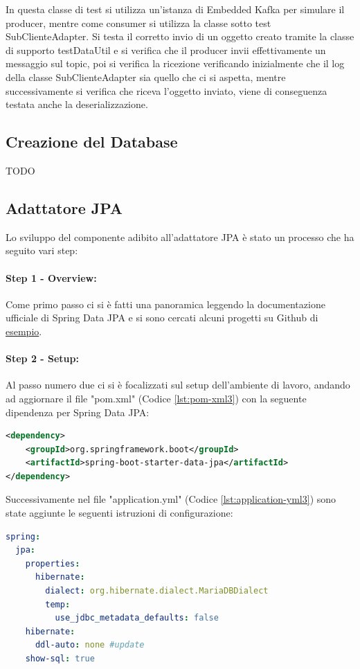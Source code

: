 In questa classe di test si utilizza un’istanza di Embedded Kafka per simulare il producer, mentre come consumer si utilizza la classe sotto test SubClienteAdapter.
Si testa il corretto invio di un oggetto creato tramite la classe di supporto testDataUtil e si verifica che il producer invii effettivamente un messaggio sul topic, poi si verifica la ricezione verificando inizialmente che il log della classe SubClienteAdapter sia quello che ci si aspetta, mentre successivamente si verifica che riceva l’oggetto inviato, viene di conseguenza testata anche la deserializzazione.


\subsection{Creazione del Database}
TODO

\subsection{Adattatore JPA}
Lo sviluppo del componente adibito all'adattatore JPA è stato un processo che ha seguito vari step:
\paragraph{Step 1 - Overview:}
Come primo passo ci si è fatti una panoramica leggendo la documentazione ufficiale di Spring Data JPA \cite{spring-data-jpa} e si sono cercati alcuni progetti su Github di \href{https://github.com/spring-projects/spring-data-examples/}{esempio}.
\paragraph{Step 2 - Setup:}
Al passo numero due ci si è focalizzati sul setup dell’ambiente di lavoro, andando ad aggiornare il file "pom.xml" (Codice \vref{lst:pom-xml3}) con la seguente dipendenza per Spring Data JPA:
\begin{lstlisting}[language=XML, caption={Aggiornamento dipendenze nel pom.xml per includere spring-data-jpa}, label=lst:pom-xml3]
<dependency>
    <groupId>org.springframework.boot</groupId>
    <artifactId>spring-boot-starter-data-jpa</artifactId>
</dependency>
\end{lstlisting}
Successivamente nel file "application.yml" (Codice \vref{lst:application-yml3}) sono state aggiunte le seguenti istruzioni di configurazione:
\begin{lstlisting}[language=yaml, caption={Aggiornamento del file `application.yml` per Spring Data JPA}, label=lst:application-yml3]
spring:
  jpa:
    properties:
      hibernate:
        dialect: org.hibernate.dialect.MariaDBDialect
        temp:
          use_jdbc_metadata_defaults: false
    hibernate:
      ddl-auto: none #update
    show-sql: true
\end{lstlisting}
